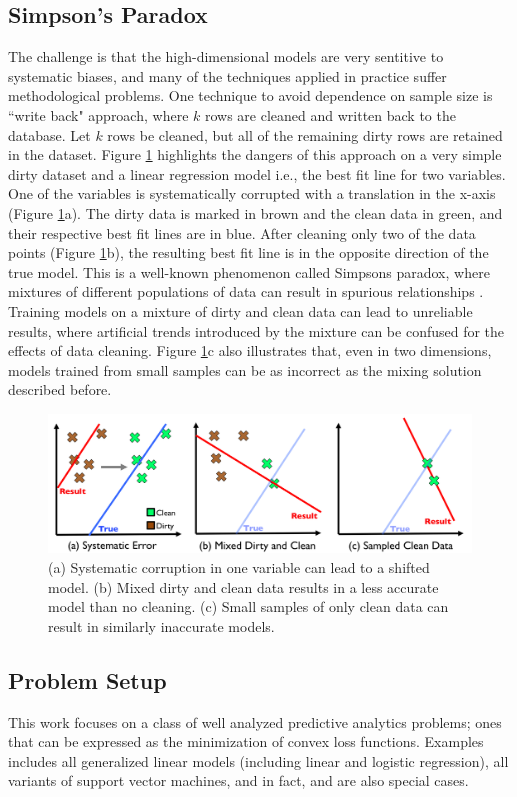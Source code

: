 \subsection{Simpson's Paradox}
The challenge is that the high-dimensional models are very sentitive to systematic biases, and many of the techniques applied in practice suffer methodological problems.
One technique to avoid dependence on sample size is ``write back" approach, where $k$ rows are cleaned and written back to the database.
Let $k$ rows be cleaned, but all of the remaining dirty rows are retained in the dataset.
Figure \ref{update-arch1} highlights the dangers of this approach on a very simple dirty dataset and a linear regression model i.e., the best fit line for two variables. 
One of the variables is systematically corrupted with a translation in the x-axis (Figure \ref{update-arch1}a).
The dirty data is marked in brown and the clean data in green, and their respective best fit lines are in blue.
After cleaning only two of the data points (Figure \ref{update-arch1}b), the resulting best fit line is in the opposite direction of the true model.
This is a well-known phenomenon called Simpsons paradox, where mixtures of different populations of data can result in spurious relationships \cite{simpson1951interpretation}.
Training models on a mixture of dirty and clean data can lead to unreliable results, where artificial trends introduced by the mixture can be confused for the effects of data cleaning.
Figure \ref{update-arch1}c also illustrates that, even in two dimensions, models trained from small samples can be as incorrect as the mixing solution described before.

\begin{figure}[ht!]
\centering
 \includegraphics[width=0.6\columnwidth]{figs/update-arch.png}
 \caption{(a) Systematic corruption in one variable can lead to a shifted model. 
 (b) Mixed dirty and clean data results in a less accurate model than no cleaning.
(c) Small samples of only clean data can result in similarly inaccurate models. \label{update-arch1}}
\end{figure}

\subsection{Problem Setup}
This work focuses on a class of well analyzed predictive analytics problems; ones that can be expressed as the minimization of convex loss functions.
Examples includes all generalized linear models (including linear and logistic regression), all variants of support vector machines, and in fact, \avgfunc and \medfunc are also special cases. 

